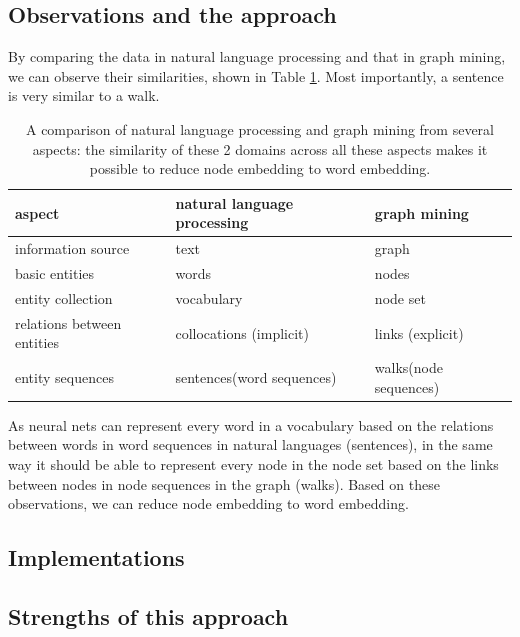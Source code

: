 \documentclass{article}
\begin{document}
\subsection{Observations and the approach}

By comparing the data in natural language processing and that in graph mining, we can observe their similarities, shown in Table \ref{tab:word_vs_node}. Most importantly, a sentence is very similar to a walk.

\begin{table}[h]
	\centering
	\begin{tabularx}{\textwidth}{ |X|X|X| } \hline
		aspect  & natural language processing & graph mining \\ \hline
		information source & text & graph \\ \hline
		basic entities & words & nodes \\ \hline
		entity collection & vocabulary & node set \\ \hline
		relations between entities & collocations (implicit) & links (explicit) \\ \hline
		entity sequences & sentences(word sequences) & walks(node sequences) \\ \hline
	\end{tabularx}
	\caption{A comparison of natural language processing and graph mining from several aspects: the similarity of these 2 domains across all these aspects makes it possible to reduce node embedding to word embedding.}
	\label{tab:word_vs_node}
\end{table}

As neural nets can represent every word in a vocabulary based on the relations between words in word sequences in natural languages (sentences), in the same way it should be able to represent every node in the node set based on the links between nodes in node sequences in the graph (walks). Based on these observations, we can reduce node embedding to word embedding.

\subsection{Implementations}

\subsection{Strengths of this approach}
\end{document}

